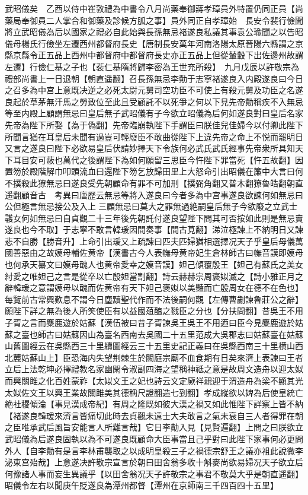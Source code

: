 武昭儀矣　乙酉以侍中崔敦禮為中書令八月尚藥奉御蔣孝璋員外特置仍同正員【尚藥局奉御員二人掌合和御藥及診候方胍之事】員外同正自孝璋始　長安令裴行儉聞將立武昭儀為后以國家之禮必自此始與長孫無忌褚遂良私議其事袁公瑜聞之以告昭儀母楊氏行儉坐左遷西州都督府長史【唐制長安萬年河南洛陽太原晉陽六縣謂之京縣京縣令正五品上西州中都督府中都督府長史亦正五品上但從輦轂下出佐邊州故謂左遷】行儉仁基之子也【裴仁基隋將歸李密為王世充所殺】　九月戊辰以許敬宗為禮部尚書上一日退朝【朝直遥翻】召長孫無忌李勣于志寧褚遂良入内殿遂良曰今日之召多為中宫上意既决逆之必死太尉元舅司空功臣不可使上有殺元舅及功臣之名遂良起於草茅無汗馬之勞致位至此且受顧託不以死爭之何以下見先帝勣稱疾不入無忌等至内殿上顧謂無忌曰皇后無子武昭儀有子今欲立昭儀為后何如遂良對曰皇后名家先帝為陛下所娶【為于偽翻】先帝臨崩執陛下手謂臣曰朕佳兒佳婦今以付卿此陛下所聞言猶在耳皇后未聞有過豈可輕廢臣不敢曲從陛下上違先帝之命上不悦而罷明日又言之遂良曰陛下必欲易皇后伏請妙擇天下令族何必武氏武氏經事先帝衆所具知天下耳目安可蔽也萬代之後謂陛下為如何願留三思臣今忤陛下罪當死【忤五故翻】因置笏於殿階解巾叩頭流血曰還陛下笏乞放歸田里上大怒命引出昭儀在簾中大言曰何不撲殺此獠無忌曰遂良受先朝顧命有罪不可加刑【撲弼角翻又普木翻獠魯皓翻朝直遥翻顧音古　考異曰唐歷云無忌等將入遂良曰今者多為中宫事遂良欲諫何如無忌曰公但極言無忌接公及入上三顧無忌曰莫大之罪無過絶嗣皇后無子今欲廢之立武士彠女何如無忌曰自貞觀二十三年後先朝託付遂良望陛下問其可否按如此則是無忌賣遂良也今不取】于志寧不敢言韓瑗因間奏事【間古莧翻】涕泣極諫上不納明日又諫悲不自勝【勝音升】上命引出瑗又上疏諫曰匹夫匹婦猶相選擇况天子乎皇后母儀萬國善惡由之故嫫母輔佐黄帝【漢書古今人表幠母黄帝妃生倉林師古曰幠音謨即嫫母也何承天纂文曰嫫母醜人也黄帝愛幸之嫫音謨】妲己傾覆殷王【妲己有蘇氏之美女紂愛之唯妲己之言是從卒以亡殷妲當割翻】詩云赫赫宗周褒姒滅之【詩小雅正月之辭韓瑗之意謂嫫毋以醜而佐黄帝有天下妲己褒姒以美豔而亡殷周女在德不在色也】每覽前古常興歎息不謂今日塵黷聖代作而不法後嗣何觀【左傳曹劌諫魯莊公之辭】願陛下詳之無為後人所笑使臣有以益國葅醢之戮臣之分也【分扶問翻】昔吳王不用子胥之言而麋鹿遊於姑蘇【漢伍被曰昔子胥諫吳王吳王不用迺曰臣今見麋鹿遊於姑蘇之臺也師古曰姑蘇因山為臺名西南去吳國二十五里范成大吳郡志曰姑蘇臺在姑蘇山舊圖經云在吳縣西三十里續圖經云三十五里史記正義曰在吳縣西南三十里横山西北麓姑蘇山上】臣恐海内失望荆棘生於闕庭宗廟不血食期有日矣來濟上表諫曰王者立后上法乾坤必擇禮教名家幽閑令淑副四海之望稱神祗之意是故周文造舟以迎太姒而興關雎之化百姓蒙祚【太姒文王之妃也詩云文定厥祥親迎于渭造舟為梁不顯其光太姒佐文王以興王業故關雎美其德稱尺證翻造七到翻】孝成縱欲以婢為后使皇統亡絶社稷傾淪【事見漢成帝紀】有周之隆既如彼大漢之禍又如此惟陛下詳察上皆不納【褚遂良韓瑗來濟言皆痛切此時去貞觀未遠士大夫敢言之氣未衰自三人者得罪在朝之臣唯承武后風旨安能言人所難言哉】它日李勣入見【見賢遍翻】上問之曰朕欲立武昭儀為后遂良固執以為不可遂良既顧命大臣事當且己乎對曰此陛下家事何必更問外人【自李勣有是言李林甫襲取之以成明皇殺三子之禍德宗舒王之議亦袓此說微李泌東宫殆哉】上意遂决許敬宗宣言於朝曰田舍翁多收十斛麥尚欲易婦况天子欲立后何豫諸人事而妄生異議乎【以田舍翁况天子許敬宗之事君不敬莫大乎是朝直遥翻】昭儀令左右以聞庚午貶遂良為潭州都督【潭州在京師南三千四百四十五里】

